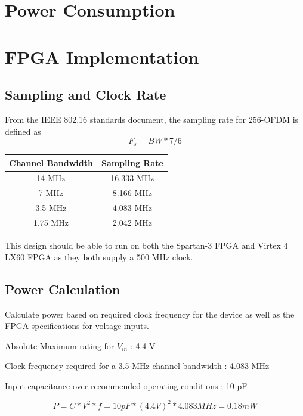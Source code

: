 \documentclass[dvips,10pt,twocolumn]{article}
\begin{document}
\section{Power Consumption}
\section{FPGA Implementation}
  \subsection{Sampling and Clock Rate}
    From the IEEE 802.16 standards document, the sampling rate for
    256-OFDM is defined as
    \begin{equation}
    F_s = BW * 7/6
    \end{equation}
  
  \begin{center}
  \begin{tabular}{c|c}
  Channel Bandwidth & Sampling Rate \\ \hline
  14 MHz & 16.333 MHz \\
  7 MHz & 8.166 MHz \\
  3.5 MHz & 4.083 MHz \\
  1.75 MHz & 2.042 MHz
  \end{tabular}
  \end{center}
  
  This design should be able to run on both the Spartan-3 FPGA and Virtex 4 LX60
  FPGA as they both supply a 500 MHz clock.
  
  \subsection{Power Calculation}
  
  Calculate power based on required clock frequency for the device as well as the
  FPGA specifications for voltage inputs.
  
  Absolute Maximum rating for $V_{in}$ : 4.4 V
  
  Clock frequency required for a 3.5 MHz channel bandwidth : 4.083 MHz
  
  Input capacitance over recommended operating conditions : 10 pF
  \begin{center}
  \begin{equation}
  P = C * V^2 * f = 10 pF * (4.4 V)^2 * 4.083 MHz = 0.18 mW
  \end{equation}
  \end{center}
  
\end{document}
